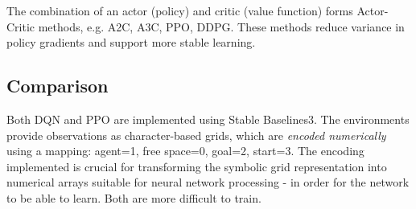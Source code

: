 \documentclass[12pt]{article}
\begin{document}




The combination of an actor (policy) and critic (value function) forms Actor-Critic methods, e.g. A2C, A3C, PPO, DDPG. These methods reduce variance in policy gradients and support more stable learning.




\subsection{Comparison}

Both DQN and PPO are implemented using Stable Baselines3.
The environments provide observations as character-based grids, which are \textit{encoded numerically} using a mapping: agent=1, free space=0, goal=2, start=3.
The encoding implemented is crucial for transforming the symbolic grid representation into numerical arrays suitable for neural network processing - in order for the network to be able to learn.
Both are more difficult to train. \\
\end{document}
